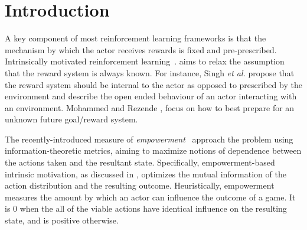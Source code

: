 \documentclass{article}
\begin{document}
\section{Introduction}
A key component of most reinforcement learning frameworks is that the mechanism by which the actor receives rewards is fixed and pre-prescribed.
Intrinsically motivated reinforcement learning~\cite{oudeyer2008can}. 
 aims to relax the assumption that the reward system is always known.
For instance, Singh \textit{et al.} \cite{singh2010intrinsically} propose that the reward system should be internal to the actor as opposed to prescribed by the environment and describe the open ended behaviour of an actor interacting with an environment.
Mohammed and Rezende \cite{mohamed2015variational}, focus on how to best prepare for an unknown future goal/reward system.

The recently-introduced measure of \emph{empowerment}~\citep{mohamed2015variational, salge2014empowerment} approach the problem using information-theoretic metrics, aiming to maximize notions of dependence between the actions taken and the resultant state.
Specifically, empowerment-based intrinsic motivation, as discussed in \citep{mohamed2015variational}, optimizes the mutual information of the action distribution and the resulting outcome.
Heuristically, empowerment measures the amount by which an actor can influence the outcome of a game.
It is $0$ when the all of the viable actions have identical influence on the resulting state, and is positive otherwise.
\end{document}
